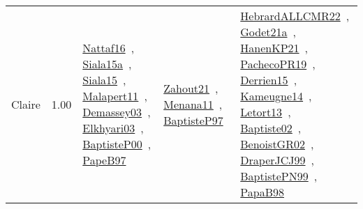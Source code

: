 {\begin{longtable}{p{3cm}r>{\raggedright\arraybackslash}p{6cm}>{\raggedright\arraybackslash}p{6cm}>{\raggedright\arraybackslash}p{8cm}}
\index{Claire}\index{CPSystems!Claire}Claire &  1.00 & \href{../works/Nattaf16.pdf}{Nattaf16}~\cite{Nattaf16}, \href{../works/Siala15a.pdf}{Siala15a}~\cite{Siala15a}, \href{../works/Siala15.pdf}{Siala15}~\cite{Siala15}, \href{../works/Malapert11.pdf}{Malapert11}~\cite{Malapert11}, \href{../works/Demassey03.pdf}{Demassey03}~\cite{Demassey03}, \href{../works/Elkhyari03.pdf}{Elkhyari03}~\cite{Elkhyari03}, \href{../works/BaptisteP00.pdf}{BaptisteP00}~\cite{BaptisteP00}, \href{../works/PapeB97.pdf}{PapeB97}~\cite{PapeB97} & \href{../works/Zahout21.pdf}{Zahout21}~\cite{Zahout21}, \href{../works/Menana11.pdf}{Menana11}~\cite{Menana11}, \href{../works/BaptisteP97.pdf}{BaptisteP97}~\cite{BaptisteP97} & \href{../works/HebrardALLCMR22.pdf}{HebrardALLCMR22}~\cite{HebrardALLCMR22}, \href{../works/Godet21a.pdf}{Godet21a}~\cite{Godet21a}, \href{../works/HanenKP21.pdf}{HanenKP21}~\cite{HanenKP21}, \href{../works/PachecoPR19.pdf}{PachecoPR19}~\cite{PachecoPR19}, \href{../works/Derrien15.pdf}{Derrien15}~\cite{Derrien15}, \href{../works/Kameugne14.pdf}{Kameugne14}~\cite{Kameugne14}, \href{../works/Letort13.pdf}{Letort13}~\cite{Letort13}, \href{../works/Baptiste02.pdf}{Baptiste02}~\cite{Baptiste02}, \href{../works/BenoistGR02.pdf}{BenoistGR02}~\cite{BenoistGR02}, \href{../works/DraperJCJ99.pdf}{DraperJCJ99}~\cite{DraperJCJ99}, \href{../works/BaptistePN99.pdf}{BaptistePN99}~\cite{BaptistePN99}, \href{../works/PapaB98.pdf}{PapaB98}~\cite{PapaB98}\\

\end{longtable}}
